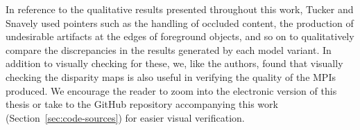 In reference to the qualitative results presented throughout this work, Tucker and Snavely used pointers such as the handling of occluded content, the production of undesirable artifacts at the edges of foreground objects, and so on to qualitatively compare the discrepancies in the results generated by each model variant. In addition to visually checking for these, we, like the authors, found that visually checking the disparity maps is also useful in verifying the quality of the MPIs produced. We encourage the reader to zoom into the electronic version of this thesis or take to the GitHub repository accompanying this work (Section~\ref{sec:code-sources}) for easier visual verification.



